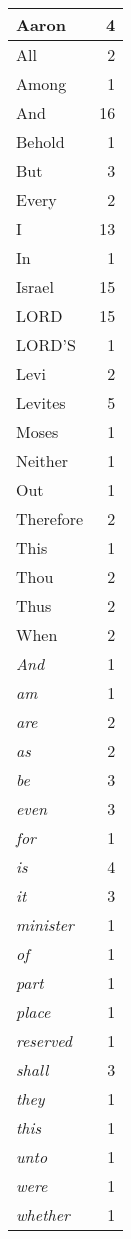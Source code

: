 \begin{center}
\begin{longtable}{l|r}
\hline \hline
\endlastfoot
Aaron & 4 \\ \hline
All & 2 \\ \hline
Among & 1 \\ \hline
And & 16 \\ \hline
Behold & 1 \\ \hline
But & 3 \\ \hline
Every & 2 \\ \hline
I & 13 \\ \hline
In & 1 \\ \hline
Israel & 15 \\ \hline
LORD & 15 \\ \hline
LORD'S & 1 \\ \hline
Levi & 2 \\ \hline
Levites & 5 \\ \hline
Moses & 1 \\ \hline
Neither & 1 \\ \hline
Out & 1 \\ \hline
Therefore & 2 \\ \hline
This & 1 \\ \hline
Thou & 2 \\ \hline
Thus & 2 \\ \hline
When & 2 \\ \hline
\emph{And} & 1 \\ \hline
\emph{am} & 1 \\ \hline
\emph{are} & 2 \\ \hline
\emph{as} & 2 \\ \hline
\emph{be} & 3 \\ \hline
\emph{even} & 3 \\ \hline
\emph{for} & 1 \\ \hline
\emph{is} & 4 \\ \hline
\emph{it} & 3 \\ \hline
\emph{minister} & 1 \\ \hline
\emph{of} & 1 \\ \hline
\emph{part} & 1 \\ \hline
\emph{place} & 1 \\ \hline
\emph{reserved} & 1 \\ \hline
\emph{shall} & 3 \\ \hline
\emph{they} & 1 \\ \hline
\emph{this} & 1 \\ \hline
\emph{unto} & 1 \\ \hline
\emph{were} & 1 \\ \hline
\emph{whether} & 1 \\ \hline

\end{longtable}
\end{center}
